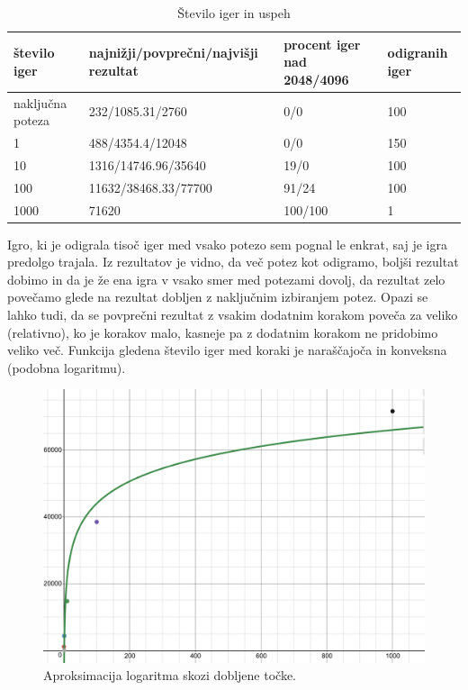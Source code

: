 \documentclass[a4paper,11pt]{article}
\begin{document}
\begin{table}[htbp]
\caption{Število iger in uspeh}
\label{tab1}
\begin{center}
\begin{tabular}{llll}
\hline
število iger & najnižji/povprečni/najvišji rezultat & procent iger nad 2048/4096 & odigranih iger\\
\hline
naključna poteza & 232/1085.31/2760 & 0/0 & 100\\
1 & 488/4354.4/12048 & 0/0 & 150\\
10 & 1316/14746.96/35640 & 19/0 & 100\\
100 & 11632/38468.33/77700 & 91/24 & 100 \\
1000 & 71620 & 100/100 & 1 \\
\hline
\end{tabular}
\end{center}
\end{table}

Igro, ki je odigrala tisoč iger med vsako potezo sem pognal le enkrat, saj je igra predolgo trajala. Iz rezultatov je vidno, da več potez kot odigramo, boljši rezultat dobimo in da je že ena igra v vsako smer med potezami dovolj, da rezultat zelo povečamo glede na rezultat dobljen z naključnim izbiranjem potez. Opazi se lahko tudi, da se povprečni rezultat z vsakim dodatnim korakom poveča za veliko (relativno), ko je korakov malo, kasneje pa z dodatnim korakom ne pridobimo veliko več. Funkcija gledena število iger med koraki je naraščajoča in konveksna (podobna logaritmu).

\begin{figure}[h!]
\begin{center}
\includegraphics[scale=0.5]{aproxi.png}
\caption{Aproksimacija logaritma skozi dobljene točke.}
\label{slika2}
\end{center}
\end{figure}
\end{document}
